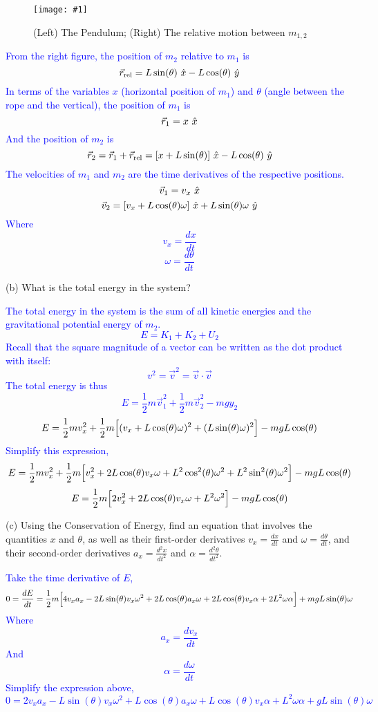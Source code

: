 \documentclass[11pt]{article}
\newcommand{\fig}[4]{
    \begin{figure}[H]
        \centering
        \texttt{[image: \#1]}
        \caption{#2}
        \label{exp4fit}
    \end{figure}
}
\theoremstyle{gangnamstyle}{\newtheorem{definition}{Definition}[]}
\theoremstyle{gangnamstyle}{\newtheorem{example}{Example}[]}
\theoremstyle{gangnamstyle}{\newtheorem{problem}{Problem}[]}
\begin{document}
\fig{figs/caps/geometry.jpeg}{(Left) The Pendulum; (Right) The relative motion between $m_{1, 2}$}{0.11}{0}

\textcolor{blue}{From the right figure, the position of $m_2$ relative to $m_1$ is
\[ \Vec{r}_{\text{rel}} = L\sin(\theta) \ \Hat{x} - L\cos(\theta) \ \Hat{y} \]
In terms of the variables $x$ (horizontal position of $m_1$) and $\theta$ (angle between the rope and the vertical), the position of $m_1$ is
\[ \Vec{r}_1 = x \ \Hat{x} \]
And the position of $m_2$ is
\[ \Vec{r}_2 = \Vec{r}_1 + \Vec{r}_{\text{rel}} = [x + L\sin(\theta)] \ \Hat{x} - L\cos(\theta) \ \Hat{y} \]
The velocities of $m_1$ and $m_2$ are the time derivatives of the respective positions.
\begin{equation}
\Vec{v}_1 = v_x \ \Hat{x}
\end{equation}
\begin{equation}
\Vec{v}_2 = [v_x + L\cos(\theta)\omega] \ \Hat{x} + L\sin(\theta)\omega \ \Hat{y}
\end{equation}
Where
\[ v_x = \frac{dx}{dt} \]
\[ \omega = \frac{d\theta}{dt} \]}

\pagebreak

(b) What is the total energy in the system? 

\textcolor{blue}{The total energy in the system is the sum of all kinetic energies and the gravitational potential energy of $m_2$. 
\[ E = K_1 + K_2 + U_2 \]
Recall that the square magnitude of a vector can be written as the dot product with itself: 
\[ v^2 = \Vec{v}^2 = \Vec{v} \cdot \Vec{v} \]
The total energy is thus
\[ E = \frac{1}{2}m\Vec{v}_1^2 + \frac{1}{2}m\Vec{v}_2^2 - mgy_2 \]
\[ E = \frac{1}{2}mv_x^2 + \frac{1}{2}m\Bigl[(v_x + L\cos(\theta)\omega)^2 + (L\sin(\theta)\omega)^2 \Bigr] - mgL\cos(\theta) \]
Simplify this expression, 
\[ E = \frac{1}{2}mv_x^2 + \frac{1}{2}m\Bigl[v_x^2 + 2L\cos(\theta)v_x\omega + L^2\cos^2(\theta)\omega^2 + L^2\sin^2(\theta)\omega^2 \Bigr] - mgL\cos(\theta) \]
\begin{equation}
E = \frac{1}{2}m\Bigl[2v_x^2 + 2L\cos(\theta)v_x\omega + L^2\omega^2 \Bigr] - mgL\cos(\theta)
\end{equation}
} 

(c) Using the Conservation of Energy, find an equation that involves the quantities $x$ and $\theta$, as well as their first-order derivatives $v_x = \frac{dx}{dt}$ and $\omega = \frac{d\theta}{dt}$, and their second-order derivatives $a_x = \frac{d^2x}{dt^2}$ and $\alpha = \frac{d^2\theta}{dt^2}$. 

\textcolor{blue}{
Take the time derivative of $E$, 
\[ 0 = \frac{dE}{dt} = \frac{1}{2}m\Bigl[ 4v_xa_x - 2L\sin(\theta)v_x\omega^2 + 2L\cos(\theta)a_x\omega + 2L\cos(\theta)v_x\alpha + 2L^2\omega\alpha \Bigr] + mgL\sin(\theta)\omega \]
Where
\[ a_x = \frac{dv_x}{dt} \]
And
\[ \alpha = \frac{d\omega}{dt} \]
Simplify the expression above, 
\begin{equation}
0 = 2v_xa_x - L\sin(\theta)v_x\omega^2 + L\cos(\theta)a_x\omega + L\cos(\theta)v_x\alpha + L^2\omega\alpha + gL\sin(\theta)\omega
\end{equation}}
\end{document}
